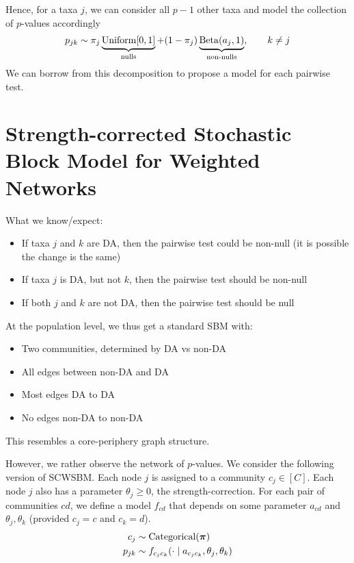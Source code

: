 \documentclass[english]{article}
\begin{document}
Hence, for a taxa $j$, we can consider all $p-1$ other taxa and model the collection of $p$-values accordingly
\begin{align*}
    p_{jk} \sim \pi_j \underbrace{\operatorname{Uniform}[0,1]}_{\text{nulls}} +
    (1-\pi_j) \underbrace{\operatorname{Beta}(a_j, 1)}_{\text{non-nulls}},\qquad k\neq j
\end{align*}
We can borrow from this decomposition to propose a model for each pairwise test.

\section{Strength-corrected Stochastic Block Model for Weighted Networks}

What we know/expect:
\begin{itemize}
    \item If taxa $j$ and $k$ are DA, then the pairwise test could be non-null (it is possible the change is the same)
    \item If taxa $j$ is DA, but not $k$, then the pairwise test should be non-null
    \item If both $j$ and $k$ are not DA, then the pairwise test should be null
\end{itemize}
At the population level, we thus get a standard SBM with:
\begin{itemize}
    \item Two communities, determined by DA vs non-DA
    \item All edges between non-DA and DA
    \item Most edges DA to DA
    \item No edges non-DA to non-DA
\end{itemize}
This resembles a core-periphery graph structure.

However, we rather observe the network of $p$-values. We consider the following version of SCWSBM.
Each node $j$ is assigned to a community $c_j\in [C]$. Each node $j$ also has a parameter $\theta_j\geqslant 0$,
the strength-correction. For each pair of communities $cd$, we define a model $f_{cd}$ that depends on some parameter
$a_{cd}$ and $\theta_j,\theta_k$ (provided $c_j=c$ and $c_k=d$).
\begin{align*}
    c_j &\sim \operatorname{Categorical}({\boldsymbol \pi}) \\ 
    p_{jk} &\sim f_{c_jc_k} (\cdot\mid a_{c_jc_k}, \theta_j,\theta_k)
\end{align*}
\end{document}
